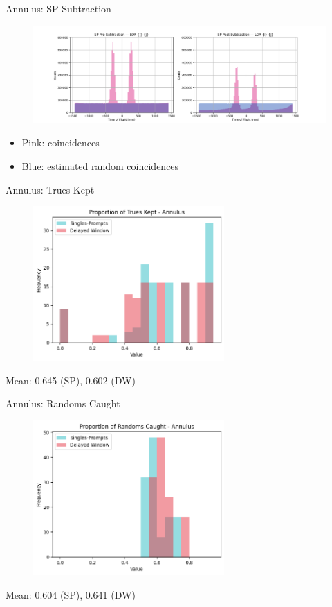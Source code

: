\documentclass[pdf]{beamer}
\begin{document}
\begin{frame}{Annulus: SP Subtraction}
    \begin{figure}
        \centering
        \includegraphics[width=\textwidth]{figures/0_10_sp.png}
    \end{figure}
    \begin{itemize}
        \item Pink: coincidences
        \item Blue: estimated random coincidences
    \end{itemize}
\end{frame}

\begin{frame}{Annulus: Trues Kept}
    \begin{figure}
        \centering
        \includegraphics[width=0.65\textwidth]{figures/trueskeptann.png}
    \end{figure}
    Mean: 0.645 (SP), 0.602 (DW)
\end{frame}

\begin{frame}{Annulus: Randoms Caught}
    \begin{figure}
        \centering
        \includegraphics[width=0.65\textwidth]{figures/randomscaughtann.png}
    \end{figure}
    Mean: 0.604 (SP), 0.641 (DW)
\end{frame}
\end{document}
